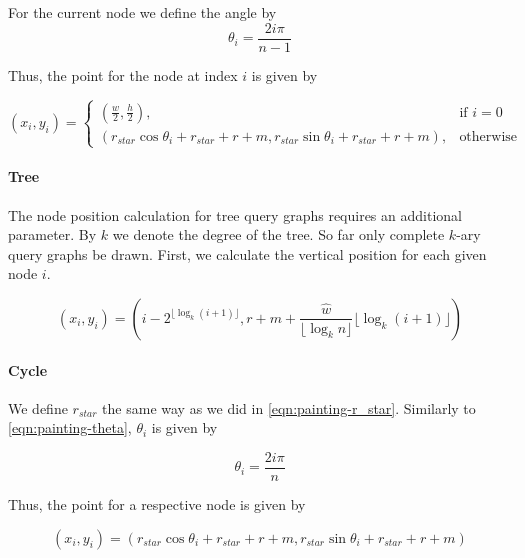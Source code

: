 For the current node we define the angle by
\begin{equation}\label{eqn:painting-theta}
    \theta_i = \frac{2i\pi}{n - 1}
\end{equation}

Thus, the point for the node at index $i$ is given by

\begin{equation}
    (x_i, y_i) = 
    \begin{cases}
        (\frac{w}{2}, \frac{h}{2}),& \text{if } i = 0\\
        (r_{star}\cos{\theta_i} + r_{star} + r + m, r_{star}\sin{\theta_i} + r_{star} + r + m), & \text{otherwise}
    \end{cases}
\end{equation}

\paragraph{Tree}

The node position calculation for tree query graphs requires an additional parameter. 
By $k$ we denote the degree of the tree. So far only complete $k$-ary query graphs be drawn.
First, we calculate the vertical position for each given node $i$.

\begin{equation}
    (x_i, y_i) = (i - 2^{\lfloor \log_k(i+1) \rfloor}, r + m + \frac{\hat{w}}{\lfloor \log_kn \rfloor} \lfloor \log_k(i + 1) \rfloor)
\end{equation}

\paragraph{Cycle} 

We define $r_{star}$ the same way as we did in \eqref{eqn:painting-r_star}.
Similarly to \eqref{eqn:painting-theta}, $\theta_i$ is given by

\begin{equation}\label{eqn:painting-theta_cycle}
    \theta_i = \frac{2i\pi}{n}
\end{equation}

Thus, the point for a respective node is given by

\begin{equation}
    (x_i, y_i) = (r_{star}\cos{\theta_i} + r_{star} + r + m, r_{star}\sin{\theta_i} + r_{star} + r + m)
\end{equation}